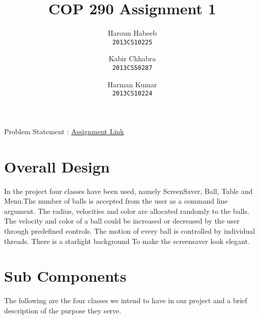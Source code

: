 \documentclass[]{article}
\begin{document}
\author{
  Haroun Habeeb\\
  \texttt{2013CS10225}
  \and
  Kabir Chhabra\\
  \texttt{2013CS50287}
  \and
  Harman Kumar\\
  \texttt{2013CS10224}
}

\title{COP 290 Assignment 1}
\maketitle



\begin{center}

Problem Statement : \href { http://www.cse.iitd.ac.in/~prathmesh/ta/COP290/ass1.html }{Assignment Link}

\end{center}


\section{Overall Design}

\begin{flushleft}

In the project four classes have been used, namely ScreenSaver, Ball, Table and Menu.The number of balls is accepted from the user as a command line argument. The radius, velocities and color are allocated randomly to the balls. The velocity and color of a ball could be increased or decreased by the user through predefined controls. The motion of every ball is controlled by individual threads. There is a starlight background To make the screensaver look elegant.

\end{flushleft} 


\section{Sub Components}

The following are the four classes we intend to have in our project and a brief description of the purpose they serve.
\end{document}
